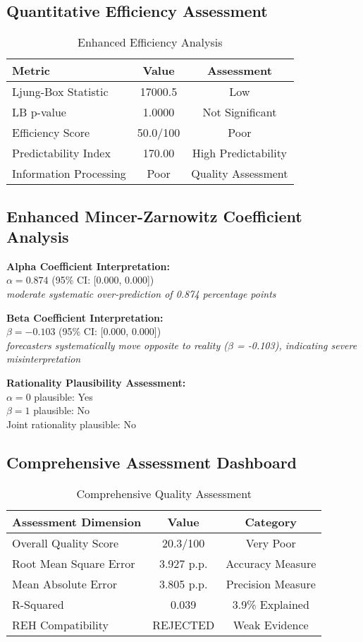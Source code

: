 \documentclass[11pt,a4paper]{article}
\begin{document}
\subsection{Quantitative Efficiency Assessment}
\begin{table}[H]
\centering
\caption{Enhanced Efficiency Analysis}
\begin{tabular}{lcc}
\toprule
\textbf{Metric} & \textbf{Value} & \textbf{Assessment} \\
\midrule
Ljung-Box Statistic & 17000.5 & Low \\
LB p-value & 1.0000 & Not Significant \\
Efficiency Score & 50.0/100 & Poor \\
Predictability Index & 170.00 & High Predictability \\
Information Processing & Poor & Quality Assessment \\
\bottomrule
\end{tabular}
\end{table}

\subsection{Enhanced Mincer-Zarnowitz Coefficient Analysis}
\textbf{Alpha Coefficient Interpretation:}\\
$\alpha = 0.874$ (95\% CI: [0.000, 0.000])\\
\textit{moderate systematic over-prediction of 0.874 percentage points}

\textbf{Beta Coefficient Interpretation:}\\
$\beta = -0.103$ (95\% CI: [0.000, 0.000])\\
\textit{forecasters systematically move opposite to reality ($\beta$ = -0.103), indicating severe misinterpretation}

\textbf{Rationality Plausibility Assessment:}\\
$\alpha = 0$ plausible: Yes\\
$\beta = 1$ plausible: No\\
Joint rationality plausible: No

\subsection{Comprehensive Assessment Dashboard}
\begin{table}[H]
\centering
\caption{Comprehensive Quality Assessment}
\begin{tabular}{lcc}
\toprule
\textbf{Assessment Dimension} & \textbf{Value} & \textbf{Category} \\
\midrule
Overall Quality Score & 20.3/100 & Very Poor \\
Root Mean Square Error & 3.927 p.p. & Accuracy Measure \\
Mean Absolute Error & 3.805 p.p. & Precision Measure \\
R-Squared & 0.039 & 3.9\% Explained \\
REH Compatibility & \textcolor{academicred}{REJECTED} & Weak Evidence \\
\bottomrule
\end{tabular}
\end{table}
\end{document}
